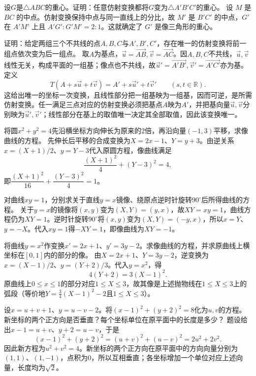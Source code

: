 设\(G\)是\(\triangle ABC\)的重心。证明：任意仿射变换都将\(G\)变为\(\triangle A'B'C'\)的重心。
\solutionanswer
设 \(M\) 是 \(BC\) 的中点。仿射变换保持中点与同一直线上的分比，故 \(M'\) 是 \(B'C'\) 的中点，\(G'\) 在 \(A'M'\) 上且 \(A'G':G'M'=2:1\)。这就确定了 \(G'\) 是像三角形的重心。


证明：给定两组三个不共线的点\(A,B,C\)与\(A',B',C'\)，存在唯一的仿射变换将前一组点依次变为后一组点。
\solutionanswer
取\(A\)为基点，\(\vec u=\overrightarrow{AB},\vec v=\overrightarrow{AC}\)。因\(A,B,C\)不共线，\(\vec u,\vec v\)线性无关，构成平面的一组基；像点也不共线，故\(\vec u'=\overrightarrow{A'B'},\vec v'=\overrightarrow{A'C'}\)亦为基。定义
\[T(A+s\vec u+t\vec v)=A'+s\vec u'+t\vec v'\qquad(s,t\in\mathbb R).\]
这给出唯一的坐标一次变换，且线性部分把一组基映为一组基，因而可逆，是所需仿射变换。任一满足三点对应的仿射变换必须把基点\(A\)映为\(A'\)，并把基向量\(\vec u,\vec v\)分别映为\(\vec u',\vec v'\)；线性部分在基上的取值唯一决定其全部取值，因此该变换唯一。


将圆\(x^2+y^2=4\)先沿横坐标方向伸长为原来的\(2\)倍，再沿向量\((-1,3)\)平移，求像曲线的方程。
\solutionanswer
先伸长后平移的合成变换为\(X=2x-1\)、\(Y=y+3\)。由逆关系\(x=(X+1)/2\)、\(y=Y-3\)代入原圆方程，像曲线满足
\[
\frac{(X+1)^2}{4}+(Y-3)^2=4,
\]
即\(\dfrac{(X+1)^2}{16}+\dfrac{(Y-3)^2}{4}=1\)。


对曲线\(xy=1\)，分别求关于直线\(y=x\)镜像、绕原点逆时针旋转\(90^\circ\)后所得曲线的方程。
\solutionanswer
关于\(y=x\)的镜像将\((x,y)\)变为\((X,Y)=(y,x)\)，故\(XY=xy=1\)，曲线方程仍为\(XY=1\)。逆时针旋转\(90^\circ\)将\((x,y)\)变为\((X,Y)=(-y,x)\)，所以\(x=Y\)、\(y=-X\)。代入\(xy=1\)得\(-XY=1\)，即像曲线为\(XY=-1\)。


将曲线\(y=x^2\)作变换\(x'=2x+1\)、\(y'=3y-2\)。求像曲线的方程，并求原曲线上横坐标在\([0,1]\)内的部分的像。
\solutionanswer
由\(X=2x+1\)、\(Y=3y-2\)，逆变换为\(x=(X-1)/2\)、\(y=(Y+2)/3\)。代入\(y=x^2\)，得
\[
4(Y+2)=3(X-1)^2.
\]
原曲线上\(0\le x\le1\)的部分对应\(1\le X\le3\)，故其像是上述抛物线在\(1\le X\le3\)上的弧段（等价地\(Y=\frac34(X-1)^2-2\)且\(1\le X\le3\)）。


设\(x=u+v+1\)、\(y=u-v-2\)。将\((x-1)^2+(y+2)^2=8\)化为\(u,v\)的方程。新坐标的两个正方向是否垂直？每个坐标单位在原平面中的长度是多少？
\solutionanswer
题设给出\(x-1=u+v\)、\(y+2=u-v\)，于是
\[
(x-1)^2+(y+2)^2=(u+v)^2+(u-v)^2=2u^2+2v^2.
\]
因此新方程为\(u^2+v^2=4\)。新坐标的两个正方向在原平面中的方向向量分别为\((1,1)\)、\((1,-1)\)，点积为\(0\)，所以互相垂直；各坐标增加一个单位对应上述向量，长度均为\(\sqrt2\)。


